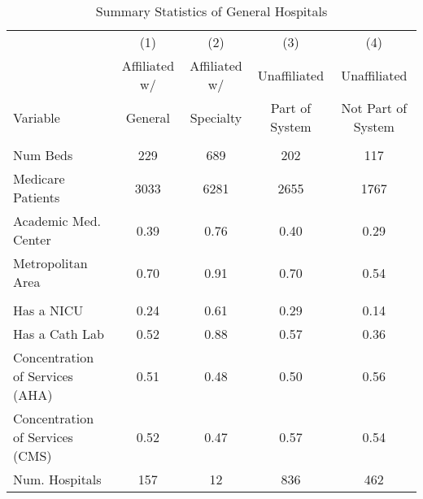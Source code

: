 \begin{table}[ht!]

\caption{Summary Statistics of General Hospitals\label{tab:hospital_general_summarystats}}
\centering
\begin{tabular}[t]{lcccc}
\toprule
 & (1) & (2) & (3) & (4)\\
 & Affiliated w/ & Affiliated w/ & Unaffiliated & Unaffiliated\\
Variable & General & Specialty & Part of System & Not Part of System\\
\midrule
\addlinespace[0.3em]
\multicolumn{5}{l}{\textbf{Characteristics}}\\
\hspace{1em}Num Beds & 229 & 689 & 202 & 117\\
\hspace{1em}Medicare Patients & 3033 & 6281 & 2655 & 1767\\
\hspace{1em}Academic Med. Center & 0.39 & 0.76 & 0.40 & 0.29\\
\hspace{1em}Metropolitan Area & 0.70 & 0.91 & 0.70 & 0.54\\
\addlinespace[0.3em]
\multicolumn{5}{l}{\textbf{Services}}\\
\hspace{1em}Has a NICU & 0.24 & 0.61 & 0.29 & 0.14\\
\hspace{1em}Has a Cath Lab & 0.52 & 0.88 & 0.57 & 0.36\\
\hspace{1em}Concentration of Services (AHA) & 0.51 & 0.48 & 0.50 & 0.56\\
\hspace{1em}Concentration of Services (CMS) & 0.52 & 0.47 & 0.57 & 0.54\\
\addlinespace[0.3em]
Num. Hospitals & 157 & 12 & 836 & 462\\
\bottomrule
\end{tabular}
\end{table}
